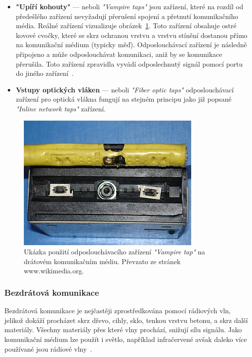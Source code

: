 \begin{itemize}
                \item \textbf{"Upíří kohouty"} --- neboli \textit{"Vampire taps"} jsou zařízení, které na rozdíl od předešlého zařízení nevyžadují přerušení spojení a přetnutí komunikačního média. Reálné zařízení vizualizuje obrázek~\ref{fig:vampireTaps}. Toto zařízení obsahuje ostré kovové cvočky, které se skrz ochranou vrstvu a vrstvu stínění dostanou přímo na komunikační médium (typicky měď). Odposlouchávací zařízení je následně připojeno a může odposlouchávat komunikaci, aniž by se komunikace přerušila. Toto zařízení zpravidla vyvádí odposlechnutý signál pomocí portu do jiného zařízení~\cite{BookTrackingHackersReference}.
                \item \textbf{Vstupy optických vláken} --- neboli \textit{"Fiber optic taps"} odposlouchávací zařízení pro optická vlákna fungují na stejném principu jako již popsané \textit{"Inline network taps"} zařízení.
            \end{itemize}

                \begin{figure}[H]
                    \centering
                    \includegraphics[scale=0.8]{obrazky-figures/ForenzniAnalyza/DukazniMaterial/vampireTap.png}
                    \caption{Ukázka použití odposlouchávacího zařízení \textit{"Vampire tap"} na drátovém komunikačním médiu. Převzato ze stránek www.wikimedia.org\footnotemark.}
                    \label{fig:vampireTaps}
                \end{figure}
            
        \subsubsection*{Bezdrátová komunikace}
            Bezdrátová komunikace je nejčastěji zprostředkována pomocí rádiových vln, jelikož dokáží procházet skrz dřevo, cihly, sklo, tenkou vrstvu betonu, a skrz další materiály. Všechny materiály přes které vlny prochází, snižují sílu signálu. Jako komunikační médium lze použít i světlo, například infračervené avšak daleko více používané jsou rádiové vlny~\cite{ComputerNetworking}.

